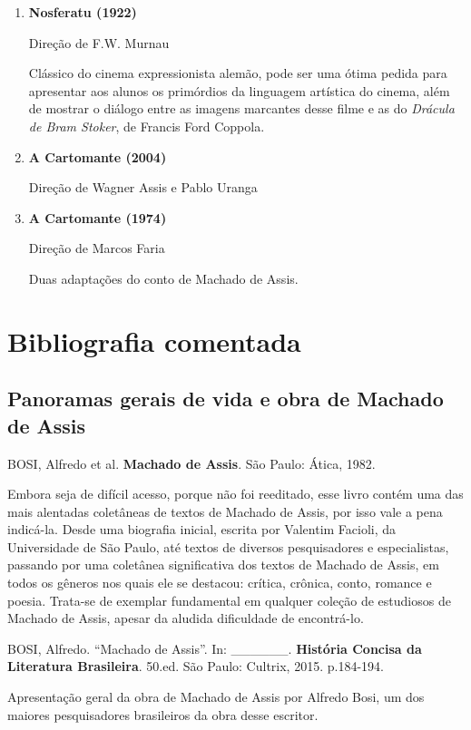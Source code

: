 \documentclass{extarticle}
\begin{document}
\begin{enumerate}
\item\textbf{Nosferatu (1922)}

Direção de F.W. Murnau

Clássico do cinema expressionista alemão, pode ser uma ótima pedida para
apresentar aos alunos os primórdios da linguagem artística do cinema,
além de mostrar o diálogo entre as imagens marcantes desse filme e as do
\emph{Drácula de Bram Stoker}, de Francis Ford Coppola.

\item\textbf{A Cartomante (2004)}

Direção de Wagner Assis e Pablo Uranga

\item\textbf{A Cartomante (1974)}

Direção de Marcos Faria

Duas adaptações do conto de Machado de Assis.
\end{enumerate}

\section{Bibliografia comentada}

\subsection{Panoramas gerais de vida e obra de Machado de Assis}

BOSI, Alfredo et al. \textbf{Machado de Assis}. São Paulo: Ática, 1982.

Embora seja de difícil acesso, porque não foi reeditado, esse livro
contém uma das mais alentadas coletâneas de textos de Machado de Assis,
por isso vale a pena indicá-la. Desde uma biografia inicial, escrita por
Valentim Facioli, da Universidade de São Paulo, até textos de diversos
pesquisadores e especialistas, passando por uma coletânea significativa
dos textos de Machado de Assis, em todos os gêneros nos quais ele se
destacou: crítica, crônica, conto, romance e poesia. Trata-se de
exemplar fundamental em qualquer coleção de estudiosos de Machado de
Assis, apesar da aludida dificuldade de encontrá-lo.

BOSI, Alfredo. ``Machado de Assis''. In: \_\_\_\_\_\_. \textbf{História
Concisa da Literatura Brasileira}. 50.ed. São Paulo: Cultrix, 2015.
p.184-194.

Apresentação geral da obra de Machado de Assis por Alfredo Bosi, um dos
maiores pesquisadores brasileiros da obra desse escritor.
\end{document}
